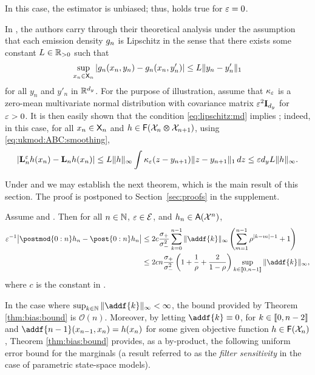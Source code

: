 \begin{example} \label{ex:exact:algorithm:cont}
In this case, the estimator is unbiased; thus,  holds true for $\varepsilon = 0$. 
\end{example}

\begin{example} In \cite{martin:jasra:singh:whiteley:delmoral:maccoy:2014}, the authors carry through their theoretical analysis under the assumption that each emission density $g_{n}$ is Lipschitz in the sense that there exists some constant $L \in \mathbb{R}_{> 0}$ such that   
\begin{equation} \label{eq:lipschitz:md}
\sup_{x_n \in \Xset_n} \left| \md{n}(x_n, y_n) - \md{n}(x_n, y'_n) \right| \leq L \| y_n - y_n' \|_1
\end{equation}
for all $y_n$ and $y'_n$ in $\mathbb{R}^{d_y}$. For the purpose of illustration, assume that $\kappa_\varepsilon$ is a zero-mean multivariate normal distribution with covariance matrix $\varepsilon^2 \mathbf{I}_{d_y}$ for $\varepsilon > 0$. It is then easily shown that the condition \eqref{eq:lipschitz:md} implies ; indeed, in this case, for all $x_n \in \mathsf{X}_n$ and $h \in \mathsf{F}(\mathcal{X}_n \varotimes \mathcal{X}_{n + 1})$, using \eqref{eq:ukmod:ABC:smoothing}, 
$$
\left| \mathbf{L}_{n}^\varepsilon h (x_n) - \mathbf{L}_n h (x_n) \right| \leq L  \|h \|_\infty \int \kappa_\varepsilon(z - y_{n + 1}) \| z - y_{n + 1} \|_1 \, d z \leq \varepsilon d_y L \|h \|_\infty. 
$$
\end{example}

Under  and  we may establish the next theorem, which is the main result of this section. The proof is postponed to Section~\ref{sec:proofs} in the supplement.  

\begin{theorem} \label{thm:bias:bound}
    Assume  and . Then for all $n \in \mathbb{N}$, $\varepsilon \in \mathcal{E}$, and $h_n \in \mathsf{A}(\mathcal{X}^n)$, 
    \begin{align*}
        \precpar^{-1} \big| \postmod{0:n} h_n -  \post{0:n} h_n \big| 
        &\leq 2 c \frac{\udup}{\udlow^2} \sum_{k = 0}^{n - 1} \| \addf{k} \|_\infty \left( \sum_{m = 1}^{n - 1} \rho^{|k - m| - 1} + 1 \right) \\
        &\leq 2 c n \frac{\udup}{\udlow^2} \left( 1 + \frac{1}{\rho} + \frac{2}{1 - \rho} \right) \sup_{k \in \intvect{0}{n - 1}} \| \addf{k} \|_\infty,   
    \end{align*}
where $c$ is the constant in . 
\end{theorem}
In the case where $\sup_{k \in \nset} \| \addf{k} \|_\infty < \infty$, the bound provided by Theorem \ref{thm:bias:bound} is $\mathcal{O}(n)$. Moreover, by letting $\addf{k} \equiv 0$, for $k \in \llbracket 0, n - 2 \rrbracket$ and $\addf{n - 1}(x_{n - 1}, x_n) = h(x_n)$ for some given objective function $h \in \mathsf{F}(\mathcal{X}_n)$, Theorem \ref{thm:bias:bound} provides, as a by-product, the following uniform error bound for the marginals (a result referred to as the \emph{filter sensitivity} in the case of parametric state-space models).  

